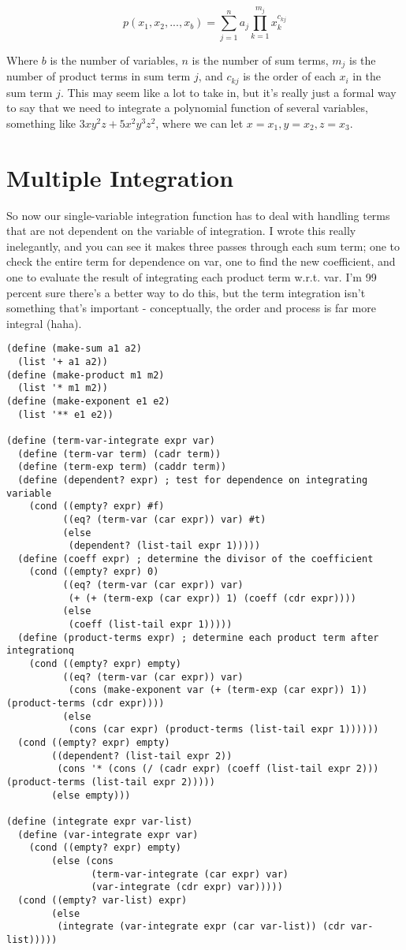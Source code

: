 \documentclass{article}
\begin{document}
\begin{equation}
p(x_{1}, x_{2}, ..., x_{b}) = \sum_{j = 1}^{n} a_{j} \prod_{k = 1}^{m_{j}}x_{k}^{c_{kj}}
\end{equation}

Where \(b\) is the number of variables, \(n\) is the number of sum terms, \(m_{j}\) is the number of product terms in sum term \(j\), and \(c_{kj}\) is the order of each \(x_{i}\) in the sum term \(j\). This may seem like a lot to take in, but it's really just a formal way to say that we need to integrate a polynomial function of several variables, something like \(3xy^{2}z + 5x^{2}y^{3}z^{2}\), where we can let \(x = x_{1}, y = x_{2}, z = x_{3}\).

\section{Multiple Integration}
So now our single-variable integration function has to deal with handling terms that are not dependent on the variable of integration. I wrote this really inelegantly, and you can see it makes three passes through each sum term; one to check the entire term for dependence on var, one to find the new coefficient, and one to evaluate the result of integrating each product term w.r.t. var. I'm 99 percent sure there's a better way to do this, but the term integration isn't something that's important - conceptually, the order and process is far more integral (haha).

\begin{lstlisting}
(define (make-sum a1 a2) 
  (list '+ a1 a2))
(define (make-product m1 m2) 
  (list '* m1 m2))
(define (make-exponent e1 e2)
  (list '** e1 e2))

(define (term-var-integrate expr var)
  (define (term-var term) (cadr term))
  (define (term-exp term) (caddr term))
  (define (dependent? expr) ; test for dependence on integrating variable
    (cond ((empty? expr) #f)
          ((eq? (term-var (car expr)) var) #t)
          (else
           (dependent? (list-tail expr 1)))))
  (define (coeff expr) ; determine the divisor of the coefficient
    (cond ((empty? expr) 0)
          ((eq? (term-var (car expr)) var)
           (+ (+ (term-exp (car expr)) 1) (coeff (cdr expr))))
          (else
           (coeff (list-tail expr 1)))))
  (define (product-terms expr) ; determine each product term after integrationq
    (cond ((empty? expr) empty)
          ((eq? (term-var (car expr)) var)
           (cons (make-exponent var (+ (term-exp (car expr)) 1)) (product-terms (cdr expr))))
          (else
           (cons (car expr) (product-terms (list-tail expr 1))))))
  (cond ((empty? expr) empty)
        ((dependent? (list-tail expr 2))
         (cons '* (cons (/ (cadr expr) (coeff (list-tail expr 2))) (product-terms (list-tail expr 2)))))
        (else empty)))

(define (integrate expr var-list)
  (define (var-integrate expr var)
    (cond ((empty? expr) empty)
        (else (cons 
               (term-var-integrate (car expr) var)
               (var-integrate (cdr expr) var)))))
  (cond ((empty? var-list) expr)
        (else
         (integrate (var-integrate expr (car var-list)) (cdr var-list)))))
\end{lstlisting}
\end{document}
